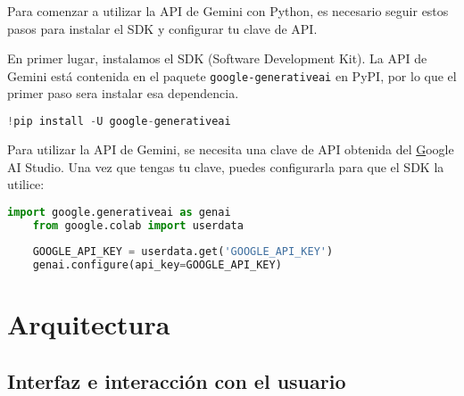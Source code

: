Para comenzar a utilizar la API de Gemini con Python, es necesario seguir estos pasos para instalar el SDK y configurar tu clave de API.

En primer lugar, instalamos el SDK (Software Development Kit). La API de Gemini está contenida en el paquete \texttt{google-generativeai} en PyPI, por lo que el primer paso sera instalar esa dependencia.

\begin{lstlisting}[language=Python]
	!pip install -U google-generativeai
\end{lstlisting}

Para utilizar la API de Gemini, se necesita una clave de API obtenida del \href{https://aistudio.google.com/app/apikey} Google AI Studio. Una vez que tengas tu clave, puedes configurarla para que el SDK la utilice:

\begin{lstlisting}[language=Python]
	import google.generativeai as genai
	from google.colab import userdata
	
	GOOGLE_API_KEY = userdata.get('GOOGLE_API_KEY')
	genai.configure(api_key=GOOGLE_API_KEY)
\end{lstlisting}

\section{Arquitectura}

\subsection{Interfaz e interacción con el usuario}


	
	
		
